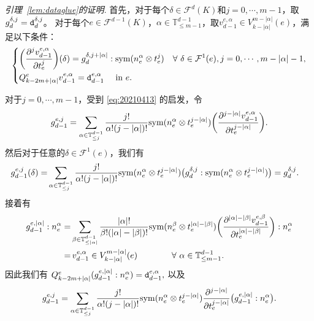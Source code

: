 \noindent\textit{引理~\ref{lem:dataglue}的证明}.
首先，对于每个$\delta\in\mathcal F^d(K)$和$j=0,\cdots,m-1$，取$g_{d}^{\delta,j}=\textnormal{\texttt{d}}_{d}^{\delta, j}$。
对于每个$e\in\mathcal F^{d-1}(K)$，$\alpha\in \mathbb{T}^{d-1}_{\leq m-1}$，取$v_{d-1}^{e,\alpha}\in V_{k-|\alpha|}^{m-|\alpha|}(e)$，满足以下条件：
\begin{equation*}
\left\{
\begin{aligned}
&\bigg(\frac{\partial^{j}v_{d-1}^{e,\alpha}}{\partial t_e^{j}}\bigg)(\delta)=g_{d}^{\delta, j+|\alpha|}:\mathrm{sym}(n_e^{\alpha}\otimes t_e^j)\quad \forall~\delta\in\mathcal F^1(e), j=0,\cdots,m-|\alpha|-1, \\
&Q_{k-2m+|\alpha|}^e v_{d-1}^{e,\alpha}=\textnormal{\texttt{d}}_{d-1}^{e,\alpha}\quad\text{ in } e.
\end{aligned}
\right.
\end{equation*}

对于$j=0,\cdots, m-1$，受到 \eqref{eq:20210413} 的启发，令
$$
g_{d-1}^{e,j} = \sum_{\alpha\in \mathbb{T}^{d-1}_{\leq j}}\frac{j!}{\alpha!(j-|\alpha|)!}\mathrm{sym}(n_e^{\alpha}\otimes t_e^{j-|\alpha|})\bigg(\frac{\partial^{j-|\alpha|}v_{d-1}^{e,\alpha}}{\partial t_e^{j-|\alpha|}}\bigg).
$$
然后对于任意的$\delta\in\mathcal F^1(e)$，我们有
\begin{align*}
    g_{d-1}^{e,j}(\delta)=&\sum_{\alpha\in \mathbb{T}^{d-1}_{\leq j}}\frac{j!}{\alpha!(j-|\alpha|)!}\mathrm{sym}(n_e^{\alpha}\otimes t_e^{j-|\alpha|})\big(g_{d}^{\delta, j}:\mathrm{sym}(n_e^{\alpha}\otimes t_e^{j-|\alpha|})\big)
=g_{d}^{\delta, j}.
\end{align*}
接着有
\begin{align*}
g_{d-1}^{e,|\alpha|}:n_e^{\alpha}=& \sum_{\beta\in \mathbb{T}^{d-1}_{\leq
|\alpha|}}\frac{|\alpha|!}{\beta!(|\alpha|-|\beta|)!}\mathrm{sym}(n_e^{\beta}\otimes t_e^{|\alpha|-|\beta|})\bigg(\frac{\partial^{|\alpha|-|\beta|}v_{d-1}^{e,\beta}}{\partial t_e^{|\alpha|-|\beta|}}\bigg):n_e^{\alpha}\\
=&\, v_{d-1}^{e,\alpha}\in
V_{k-|\alpha|}^{m-|\alpha|}(e)\qquad\qquad\forall~\alpha\in
\mathbb{T}^{d-1}_{\leq m-1}.
\end{align*}
因此我们有
$
Q_{k-2m+|\alpha|}^e(g_{d-1}^{e,|\alpha|}:n_e^{\alpha})=\textnormal{\texttt{d}}_{d-1}^{e,\alpha},
$ 以及
$$
g_{d-1}^{e,j} = \sum_{\alpha\in \mathbb{T}^{d-1}_{\leq j}}\frac{j!}{\alpha!(j-|\alpha|)!}\mathrm{sym}(n_e^{\alpha}\otimes t_e^{j-|\alpha|})\frac{\partial^{j-|\alpha|}}{\partial t_e^{j-|\alpha|}}\big(g_{d-1}^{e,|\alpha|}:n_e^{\alpha}\big).
$$

